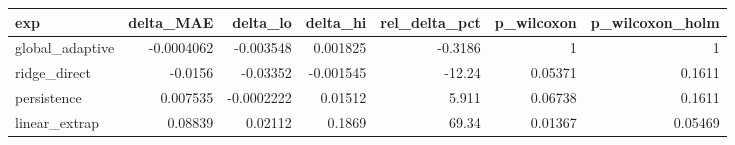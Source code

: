 \begin{tabular}{lrrrrrr}
\toprule
exp & delta\_MAE & delta\_lo & delta\_hi & rel\_delta\_pct & p\_wilcoxon & p\_wilcoxon\_holm \\
\midrule
global\_adaptive & -0.0004062 & -0.003548 & 0.001825 & -0.3186 & 1 & 1 \\
ridge\_direct & -0.0156 & -0.03352 & -0.001545 & -12.24 & 0.05371 & 0.1611 \\
persistence & 0.007535 & -0.0002222 & 0.01512 & 5.911 & 0.06738 & 0.1611 \\
linear\_extrap & 0.08839 & 0.02112 & 0.1869 & 69.34 & 0.01367 & 0.05469 \\
\bottomrule
\end{tabular}

